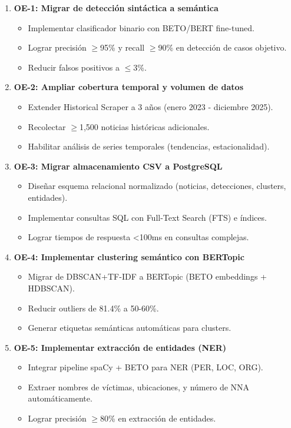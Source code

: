 \begin{enumerate}
    \item \textbf{OE-1: Migrar de detección sintáctica a semántica}
    \begin{itemize}
        \item Implementar clasificador binario con BETO/BERT fine-tuned.
        \item Lograr precisión $\geq$95\% y recall $\geq$90\% en detección de casos objetivo.
        \item Reducir falsos positivos a $\leq$3\%.
    \end{itemize}
    
    \item \textbf{OE-2: Ampliar cobertura temporal y volumen de datos}
    \begin{itemize}
        \item Extender Historical Scraper a 3 años (enero 2023 - diciembre 2025).
        \item Recolectar $\geq$1,500 noticias históricas adicionales.
        \item Habilitar análisis de series temporales (tendencias, estacionalidad).
    \end{itemize}
    
    \item \textbf{OE-3: Migrar almacenamiento CSV a PostgreSQL}
    \begin{itemize}
        \item Diseñar esquema relacional normalizado (noticias, detecciones, clusters, entidades).
        \item Implementar consultas SQL con Full-Text Search (FTS) e índices.
        \item Lograr tiempos de respuesta <100ms en consultas complejas.
    \end{itemize}
    
    \item \textbf{OE-4: Implementar clustering semántico con BERTopic}
    \begin{itemize}
        \item Migrar de DBSCAN+TF-IDF a BERTopic (BETO embeddings + HDBSCAN).
        \item Reducir outliers de 81.4\% a 50-60\%.
        \item Generar etiquetas semánticas automáticas para clusters.
    \end{itemize}
    
    \item \textbf{OE-5: Implementar extracción de entidades (NER)}
    \begin{itemize}
        \item Integrar pipeline spaCy + BETO para NER (PER, LOC, ORG).
        \item Extraer nombres de víctimas, ubicaciones, y número de NNA automáticamente.
        \item Lograr precisión $\geq$80\% en extracción de entidades.
    \end{itemize}
    

\end{enumerate}
